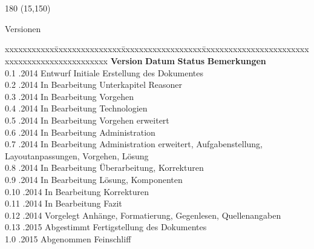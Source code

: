 
\chapter*{}
\label{chap:versionen}

\begin{textblock}{180} (15,150)
\color{black}
\begin{huge}
Versionen
\end{huge}
\vspace{10mm}

\fontsize{10pt}{18pt}\selectfont
\begin{tabbing}
xxxxxxxxxxx\=xxxxxxxxxxxxxxx\=xxxxxxxxxxxxxxxxxx\=xxxxxxxxxxxxxxxxxxxxxxxxxxxxxxxxxxxxxxxxxxxxxxx \kill
\textbf{Version}	\> \textbf{Datum}	\> \textbf{Status}		\> \textbf{Bemerkungen}		\\
0.1	.2014	\> Entwurf		\> Initiale Erstellung des Dokumentes	\\	
0.2	.2014	\> In Bearbeitung		\> Unterkapitel Reasoner	\\	
0.3	.2014	\> In Bearbeitung		\> Vorgehen	\\	
0.4	.2014	\> In Bearbeitung		\> Technologien	\\
0.5	.2014	\> In Bearbeitung		\> Vorgehen erweitert	\\	
0.6	.2014	\> In Bearbeitung		\> Administration	\\ 
0.7	.2014	\> In Bearbeitung		\> Administration erweitert, Aufgabenstellung, \\
    \>              \>              	\> Layoutanpassungen, Vorgehen, Lösung \\
0.8	.2014	\> In Bearbeitung		\> Überarbeitung, Korrekturen \\
0.9	.2014	\> In Bearbeitung		\> Lösung, Komponenten \\
0.10	.2014	\> In Bearbeitung		\> Korrekturen \\
0.11	.2014	\> In Bearbeitung		\> Fazit \\
0.12	.2014	\> Vorgelegt		\> Anhänge, Formatierung, Gegenlesen, Quellenangaben \\
0.13 .2015\> Abgestimmt \> Fertigstellung des Dokumentes \\
1.0 .2015\> Abgenommen \> Feinschliff
\end{tabbing}

\end{textblock}

